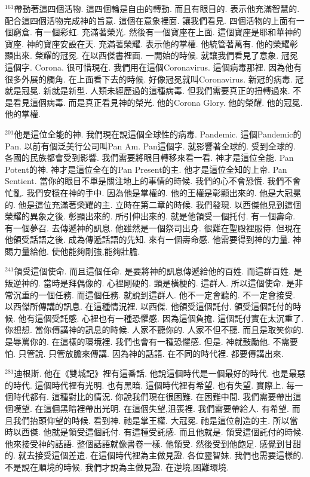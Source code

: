 \documentclass{book}
\begin{document}
$^{161}$帶動著這四個活物.
這四個輪是自由的轉動.
而且有眼目的.
表示他充滿智慧的.
配合這四個活物完成神的旨意.
這個在意象裡面.
讓我們看見.
四個活物的上面有一個窮倉.
有一個彩虹.
充滿著榮光.
然後有一個寶座在上面.
這個寶座是耶和華神的寶座.
神的寶座安設在天.
充滿著榮耀.
表示他的掌權.
他統管著萬有.
他的榮耀彰顯出來.
榮耀的冠冕.
在以西傑書裡面.
一開始的時候.
就讓我們看見了意象.
冠冕這個字.
Corona.
很可惜現在.
我們用在這個Coronavirus.
這個病毒那裡.
因為他有很多外展的觸角.
在上面看下去的時候.
好像冠冕就叫Coronavirus.
新冠的病毒.
冠就是冠冕.
新就是新型.
人類未經歷過的這種病毒.
但我們需要真正的扭轉過來.
不是看見這個病毒.
而是真正看見神的榮光.
他的Corona Glory.
他的榮耀.
他的冠冕.
他的掌權.

$^{201}$他是這位全能的神.
我們現在說這個全球性的病毒.
Pandemic.
這個Pandemic的Pan.
以前有個泛美行公司叫Pan Am.
Pan這個字.
就影響著全球的.
受到全球的.
各國的民族都會受到影響.
我們需要將眼目轉移來看一看.
神才是這位全能.
Pan Potent的神.
神才是這位全在的Pan Present的主.
他才是這位全知的上帝.
Pan Sentient.
當你的眼目不單是關注地上的事情的時候.
我們的心不會恐慌.
我們不會忙亂.
我們安穩在神的手中.
因為他是掌權的.
他的王權是彰顯出來的.
他是大冠冕的.
他是這位充滿著榮耀的主.
立時在第二章的時候.
我們發現.
以西傑他見到這個榮耀的異象之後.
彰顯出來的.
所引伸出來的.
就是他領受一個托付.
有一個壽命.
有一個夢召.
去傳遞神的訊息.
他雖然是一個祭司出身.
很難在聖殿裡服侍.
但現在他領受話語之後.
成為傳遞話語的先知.
來有一個壽命感.
他需要得到神的力量.
神賜力量給他.
使他能夠剛強,能夠壯膽.

$^{241}$領受這個使命.
而且這個任命.
是要將神的訊息傳遞給他的百姓.
而這群百姓.
是叛逆神的.
當時是拜偶像的.
心裡剛硬的.
頸是橫梗的.
這群人.
所以這個使命.
是非常沉重的一個任務.
而這個任務.
就說到這群人.
他不一定會聽的.
不一定會接受.
以西傑所傳講的訊息.
在這種情況裡.
以西傑.
他領受這個託付.
領受這個託付的時候.
他有這個受託感.
心裡也有一種恐懼感.
因為這個負擔.
這個託付實在太沉重了.
你想想.
當你傳講神的訊息的時候.
人家不聽你的.
人家不但不聽.
而且是取笑你的.
是辱罵你的.
在這樣的環境裡.
我們也會有一種恐懼感.
但是.
神就鼓勵他.
不需要怕.
只管說.
只管放膽來傳講.
因為神的話語.
在不同的時代裡.
都要傳講出來.

$^{281}$迪根斯.
他在《雙城記》裡有這番話.
他說這個時代是一個最好的時代.
也是最惡的時代.
這個時代裡有光明.
也有黑暗.
這個時代裡有希望.
也有失望.
實際上.
每一個時代都有.
這種對比的情況.
你說我們現在很困難.
在困難中間.
我們需要帶出這個嘆望.
在這個黑暗裡帶出光明.
在這個失望,沮喪裡.
我們需要帶給人.
有希望.
而且我們抬頭仰望的時候.
看到神.
祂是掌王權.
大冠冕.
祂是這位創造的主.
所以當時以西傑.
他就是領受這個託付.
有這種受託感.
而且他就是.
領受這個託付的時候.
他來接受神的話語.
整個話語就像書卷一樣.
他領受.
然後受到他飽足.
感覺到甘甜的.
就去接受這個差遣.
在這個時代裡為主做見證.
各位靈智妹.
我們也需要這樣的.
不是說在順境的時候.
我們才說為主做見證.
在逆境,困難環境.
\end{document}
